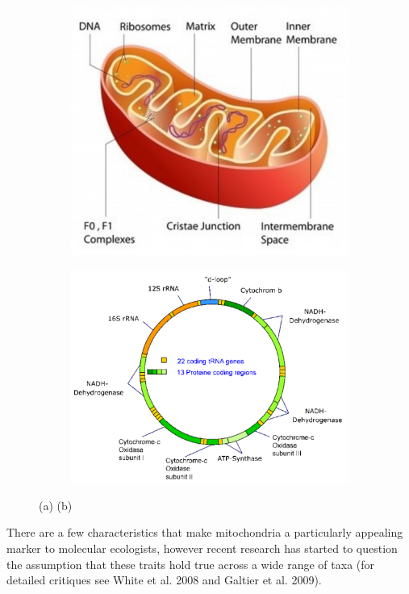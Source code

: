 \documentclass{report}\usepackage[]{graphicx}\usepackage[]{color}
\begin{document}
\begin{figure}[h]
\centering
  \begin{subfigure}[b]{.5\linewidth}
    \centering
    \includegraphics[width=.7\textwidth]{images/mito.pdf}
    \caption{}\label{fig:MGpro}
  \end{subfigure}%
  \hfill
  \begin{subfigure}[b]{.5\linewidth}
    \centering
    \includegraphics[width=.99\textwidth]{images/mtDNA.pdf}
    \caption{}\label{fig:MGchem}
  \end{subfigure}%
  \caption{(a)   (b) }\label{fig:MG}
\end{figure}

There are a few characteristics that make mitochondria a particularly appealing marker to molecular ecologists, 
however recent research has started to question the assumption that these traits hold true
across a wide range of taxa (for detailed critiques see White et al. 2008 and Galtier et al. 2009). 
\end{document}
